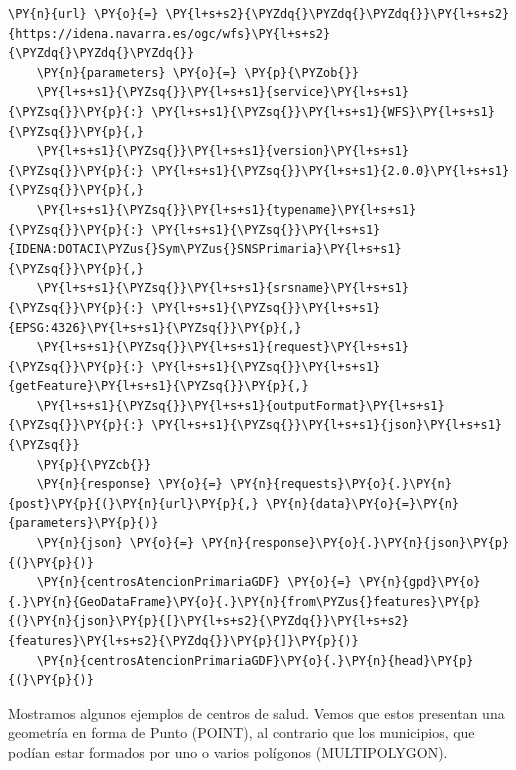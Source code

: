 \begin{tcolorbox}[breakable, size=fbox, boxrule=1pt, pad at break*=1mm,colback=cellbackground, colframe=cellborder, fontupper=\footnotesize]
    \begin{Verbatim}[commandchars=\\\{\}]
    \PY{n}{url} \PY{o}{=} \PY{l+s+s2}{\PYZdq{}\PYZdq{}\PYZdq{}}\PY{l+s+s2}{https://idena.navarra.es/ogc/wfs}\PY{l+s+s2}{\PYZdq{}\PYZdq{}\PYZdq{}}
    \PY{n}{parameters} \PY{o}{=} \PY{p}{\PYZob{}}
    \PY{l+s+s1}{\PYZsq{}}\PY{l+s+s1}{service}\PY{l+s+s1}{\PYZsq{}}\PY{p}{:} \PY{l+s+s1}{\PYZsq{}}\PY{l+s+s1}{WFS}\PY{l+s+s1}{\PYZsq{}}\PY{p}{,}
    \PY{l+s+s1}{\PYZsq{}}\PY{l+s+s1}{version}\PY{l+s+s1}{\PYZsq{}}\PY{p}{:} \PY{l+s+s1}{\PYZsq{}}\PY{l+s+s1}{2.0.0}\PY{l+s+s1}{\PYZsq{}}\PY{p}{,}
    \PY{l+s+s1}{\PYZsq{}}\PY{l+s+s1}{typename}\PY{l+s+s1}{\PYZsq{}}\PY{p}{:} \PY{l+s+s1}{\PYZsq{}}\PY{l+s+s1}{IDENA:DOTACI\PYZus{}Sym\PYZus{}SNSPrimaria}\PY{l+s+s1}{\PYZsq{}}\PY{p}{,}
    \PY{l+s+s1}{\PYZsq{}}\PY{l+s+s1}{srsname}\PY{l+s+s1}{\PYZsq{}}\PY{p}{:} \PY{l+s+s1}{\PYZsq{}}\PY{l+s+s1}{EPSG:4326}\PY{l+s+s1}{\PYZsq{}}\PY{p}{,}
    \PY{l+s+s1}{\PYZsq{}}\PY{l+s+s1}{request}\PY{l+s+s1}{\PYZsq{}}\PY{p}{:} \PY{l+s+s1}{\PYZsq{}}\PY{l+s+s1}{getFeature}\PY{l+s+s1}{\PYZsq{}}\PY{p}{,}
    \PY{l+s+s1}{\PYZsq{}}\PY{l+s+s1}{outputFormat}\PY{l+s+s1}{\PYZsq{}}\PY{p}{:} \PY{l+s+s1}{\PYZsq{}}\PY{l+s+s1}{json}\PY{l+s+s1}{\PYZsq{}}
    \PY{p}{\PYZcb{}}
    \PY{n}{response} \PY{o}{=} \PY{n}{requests}\PY{o}{.}\PY{n}{post}\PY{p}{(}\PY{n}{url}\PY{p}{,} \PY{n}{data}\PY{o}{=}\PY{n}{parameters}\PY{p}{)}
    \PY{n}{json} \PY{o}{=} \PY{n}{response}\PY{o}{.}\PY{n}{json}\PY{p}{(}\PY{p}{)}
    \PY{n}{centrosAtencionPrimariaGDF} \PY{o}{=} \PY{n}{gpd}\PY{o}{.}\PY{n}{GeoDataFrame}\PY{o}{.}\PY{n}{from\PYZus{}features}\PY{p}{(}\PY{n}{json}\PY{p}{[}\PY{l+s+s2}{\PYZdq{}}\PY{l+s+s2}{features}\PY{l+s+s2}{\PYZdq{}}\PY{p}{]}\PY{p}{)}
    \PY{n}{centrosAtencionPrimariaGDF}\PY{o}{.}\PY{n}{head}\PY{p}{(}\PY{p}{)}
    \end{Verbatim}
\end{tcolorbox}
    
Mostramos algunos ejemplos de centros de salud. Vemos que estos presentan una geometría en forma de Punto (POINT), al contrario que los municipios,
que podían estar formados por uno o varios polígonos (MULTIPOLYGON).

